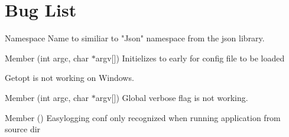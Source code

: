 \chapter{Bug List}
\hypertarget{bug}{}\label{bug}

\begin{DoxyRefList}
\item[Namespace \doxylink{namespacejson}{json} ]\label{bug__bug000001}%
%
 Name to similiar to "{}\+Json"{} namespace from the json library.  
\item[Member \doxylink{main_8cpp_a2b2d4ce8b34d14b9e775eaf6214b00e1}{main} (int argc, char \texorpdfstring{$\ast$}{*}argv\mbox{[}\mbox{]})]\label{bug__bug000004}%
%
Initielizes to early for config file to be loaded 

\label{bug__bug000005}%
%
Getopt is not working on Windows.  
\item[Member \doxylink{classutils_1_1StartupHandler_a9cdd57841cee245c1a1c94b0efe6549c}{utils\+::Startup\+Handler\+::get\+Options} (int argc, char \texorpdfstring{$\ast$}{*}argv\mbox{[}\mbox{]})]\label{bug__bug000003}%
%
 Global verbose flag is not working. 
\item[Member \doxylink{classutils_1_1StartupHandler_ade70b280d4385f270829b177da44b169}{utils\+::Startup\+Handler\+::init\+Easy\+Logging} ()]\label{bug__bug000002}%
%
 Easylogging conf only recognized when running application from source dir 
\end{DoxyRefList}